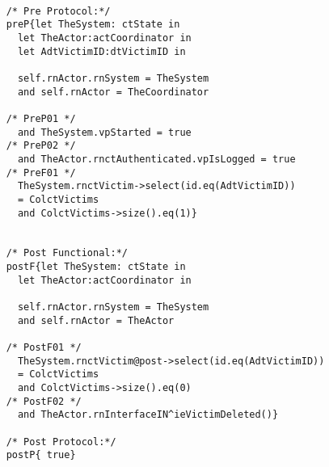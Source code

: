 	\scriptsize
	\vspace{0.5cm}
	\begin{lstlisting}[style=MessirStyle,firstnumber=auto,captionpos=b,caption={\msrmessir (MCL-oriented) specification of the operation \emph{oeDeleteVictim}.},label=OM-actCoordinator-oeDeleteVictim-MCL-LST]

	/* Pre Protocol:*/ 
	preP{let TheSystem: ctState in
	  let TheActor:actCoordinator in
	  let AdtVictimID:dtVictimID in
	  
	  self.rnActor.rnSystem = TheSystem
	  and self.rnActor = TheCoordinator
	  
	/* PreP01 */
	  and TheSystem.vpStarted = true
	/* PreP02 */
	  and TheActor.rnctAuthenticated.vpIsLogged = true
	/* PreF01 */
	  TheSystem.rnctVictim->select(id.eq(AdtVictimID))
	  = ColctVictims
	  and ColctVictims->size().eq(1)}
	
	
	/* Post Functional:*/ 
	postF{let TheSystem: ctState in
	  let TheActor:actCoordinator in
	  
	  self.rnActor.rnSystem = TheSystem
	  and self.rnActor = TheActor
	  
	/* PostF01 */
	  TheSystem.rnctVictim@post->select(id.eq(AdtVictimID))
	  = ColctVictims
	  and ColctVictims->size().eq(0)
	/* PostF02 */
	  and TheActor.rnInterfaceIN^ieVictimDeleted()}
	
	/* Post Protocol:*/ 
	postP{ true}
	
	\end{lstlisting}
	\normalsize 
	
	
	
	






